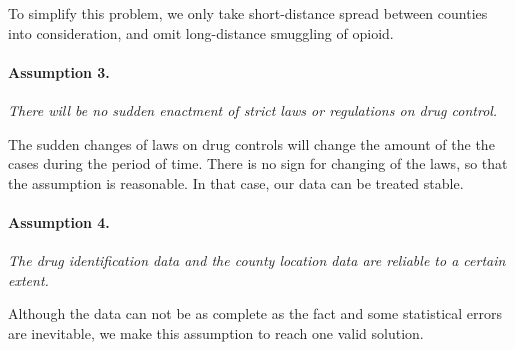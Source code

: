 \documentclass{mcmthesis}
\begin{document}
	\upshape To simplify this problem, we only take short-distance spread between counties into consideration, and omit long-distance smuggling of opioid.
	
	\paragraph{Assumption 3.}\itshape{There will be no sudden enactment of strict laws or regulations on drug control.}
	
	\upshape The sudden changes of laws on drug controls will change the amount of the the cases during the period of time. There is no sign for changing of the laws, so that the assumption is reasonable. In that case, our data can be treated stable.
	
	\paragraph{Assumption 4.}\itshape{The drug identification data and the county location data are reliable to a certain extent.}
	
	\upshape Although the data can not be as complete as the fact and some statistical errors are inevitable, we make this assumption to reach one valid solution.
\end{document}
